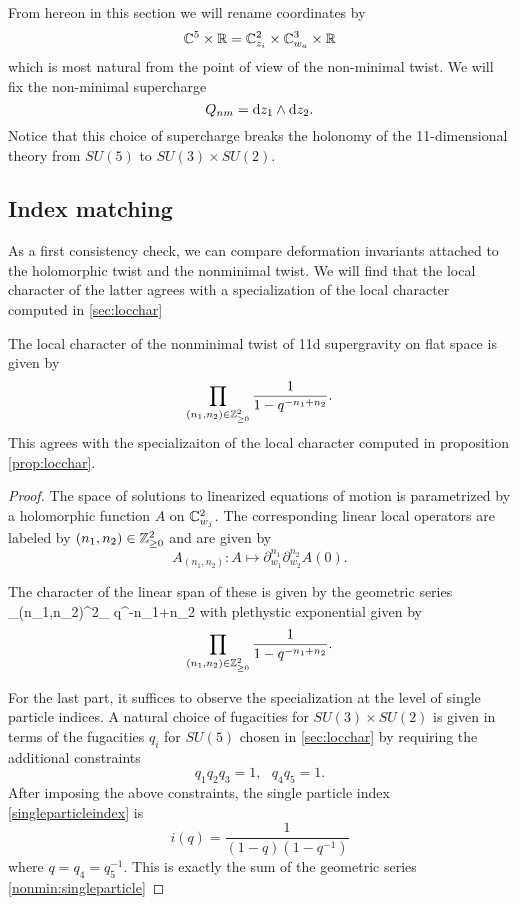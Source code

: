 From hereon in this section we will rename coordinates by
\[
\mathbb C^5 \times \mathbb R = \mathbb C^2_{z_i} \times \mathbb C^3_{w_a} \times \mathbb R
\]
which is most natural from the point of view of the non-minimal twist. 
We will fix the non-minimal supercharge 
\[
Q_{nm} = {\rm d} z_1 \wedge {\rm d} z_2 .
\]
Notice that this choice of supercharge breaks the holonomy of the 11-dimensional theory from $SU(5)$ to $SU(3) \times SU(2)$. 

\subsection{Index matching}
\label{sec:indexcheck}

As a first consistency check, we can compare deformation invariants attached to the holomorphic twist and the nonminimal twist. We will find that the local character of the latter agrees with a specialization of the local character computed in \ref{sec:locchar}

\begin{prop}
The  local character of the nonminimal twist of 11d supergravity on flat space is given by
\[
\prod _{(n_1,n_2)\in \mathbb{Z}^2_{\geq 0}} \frac{1}{1-q^{-n_1+n_2}}.
\] 
This agrees with the specializaiton of the local character computed in proposition \ref{prop:locchar}.
\end{prop}
\begin{proof}
The space of solutions to linearized equations of motion is parametrized by a holomorphic function $A$ on $\mathbb{C}^2_{w_j}$. The corresponding linear local operators are labeled by $(n_1,n_2)\in \mathbb{Z}^2_{\geq 0}$  and are given by 
\[
A_{(n_1,n_2)} : A \mapsto \partial_{w_1}^{n_1}\partial_{w_2}^{n_2} A (0).
\]

The character of the linear span of these is given by the geometric series
\beqn\label{nonmin:singleparticle}
\sum _{(n_1,n_2)\in \Z^2_{}} q^{-n_1+n_2}
\eeqn
with plethystic exponential given by 
\[
\prod _{(n_1,n_2)\in \mathbb{Z}^2_{\geq 0}} \frac{1}{1-q^{-n_1+n_2}}.
\]

For the last part, it suffices to observe the specialization at the level of single particle indices. A natural choice of fugacities for $SU(3)\times SU(2)$ is given in terms of the fugacities $q_i$ for $SU(5)$ chosen in \ref{sec:locchar} by requiring the additional constraints \[q_1q_2q_3 = 1, \ \ \ q_4q_5=1.\]
After imposing the above constraints, the single particle index \ref{singleparticleindex} is
\[
i(q) = \frac{1}{(1-q)(1-q^{-1})}
\]
where $q = q_4=q_5^{-1}$. This is exactly the sum of the geometric series \ref{nonmin:singleparticle}

\end{proof}

